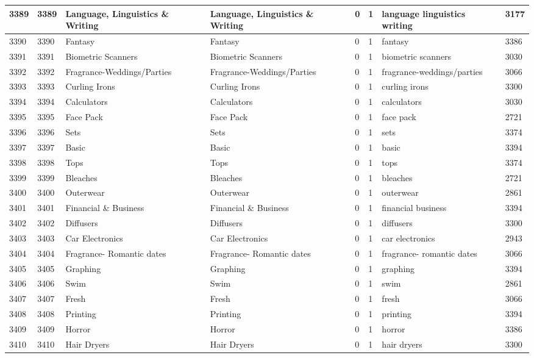 \begin{longtable}{|l|l|l|l|l|l|l|l|}
3389 & 3389 & Language, Linguistics \& Writing & Language, Linguistics \& Writing & 0 & 1 & language linguistics writing & 3177 \\ \hline 
3390 & 3390 & Fantasy & Fantasy & 0 & 1 & fantasy & 3386 \\ \hline 
3391 & 3391 & Biometric Scanners & Biometric Scanners & 0 & 1 & biometric scanners & 3030 \\ \hline 
3392 & 3392 & Fragrance-Weddings/Parties & Fragrance-Weddings/Parties & 0 & 1 & fragrance-weddings/parties & 3066 \\ \hline 
3393 & 3393 & Curling Irons & Curling Irons & 0 & 1 & curling irons & 3300 \\ \hline 
3394 & 3394 & Calculators & Calculators & 0 & 1 & calculators & 3030 \\ \hline 
3395 & 3395 & Face Pack & Face Pack & 0 & 1 & face pack & 2721 \\ \hline 
3396 & 3396 & Sets & Sets & 0 & 1 & sets & 3374 \\ \hline 
3397 & 3397 & Basic & Basic & 0 & 1 & basic & 3394 \\ \hline 
3398 & 3398 & Tops & Tops & 0 & 1 & tops & 3374 \\ \hline 
3399 & 3399 & Bleaches & Bleaches & 0 & 1 & bleaches & 2721 \\ \hline 
3400 & 3400 & Outerwear & Outerwear & 0 & 1 & outerwear & 2861 \\ \hline 
3401 & 3401 & Financial \& Business & Financial \& Business & 0 & 1 & financial business & 3394 \\ \hline 
3402 & 3402 & Diffusers & Diffusers & 0 & 1 & diffusers & 3300 \\ \hline 
3403 & 3403 & Car Electronics & Car Electronics & 0 & 1 & car electronics & 2943 \\ \hline 
3404 & 3404 & Fragrance- Romantic dates & Fragrance- Romantic dates & 0 & 1 & fragrance- romantic dates & 3066 \\ \hline 
3405 & 3405 & Graphing & Graphing & 0 & 1 & graphing & 3394 \\ \hline 
3406 & 3406 & Swim & Swim & 0 & 1 & swim & 2861 \\ \hline 
3407 & 3407 & Fresh & Fresh & 0 & 1 & fresh & 3066 \\ \hline 
3408 & 3408 & Printing & Printing & 0 & 1 & printing & 3394 \\ \hline 
3409 & 3409 & Horror & Horror & 0 & 1 & horror & 3386 \\ \hline 
3410 & 3410 & Hair Dryers & Hair Dryers & 0 & 1 & hair dryers & 3300 \\ \hline 

\end{longtable}
